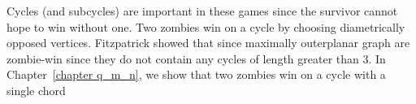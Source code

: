 Cycles (and subcycles) are important in these games since the survivor cannot hope to win without one. Two zombies win on a cycle by choosing diametrically opposed vertices. Fitzpatrick showed that since maximally outerplanar graph are zombie-win since they do not contain any cycles of length greater than 3. In Chapter~\ref{chapter q_m_n}, we show that two zombies win on a cycle with a single chord
